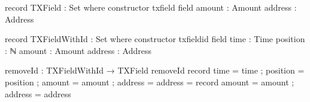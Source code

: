 \documentclass{beamer}
\begin{document}
\begin{frame}
\begin{code}

    record TXField : Set where
      constructor txfield
      field
        amount  : Amount
        address : Address

    record TXFieldWithId : Set where
      constructor txfieldid
      field
        time     : Time
        position : ℕ
        amount   : Amount
        address  : Address

    removeId : TXFieldWithId → TXField
    removeId record { time = time ; position = position
      ; amount = amount ; address = address }
      = record { amount = amount ; address = address }

\end{code}
\end{frame}
\end{document}
